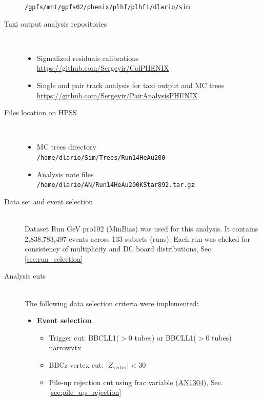 \begin{description}
         \texttt{/gpfs/mnt/gpfs02/phenix/plhf/plhf1/dlario/sim}
      \item[Taxi output analysis repositories]~
         \begin{itemize}
            \item{Sigmalized residuals calibrations} \\
               \url{https://github.com/Sergeyir/CalPHENIX}
            \item{Single and pair track analysis for taxi output and MC trees} \\
               \url{https://github.com/Sergeyir/PairAnalysisPHENIX} 
         \end{itemize}
      \item[Files location on HPSS]~
         \begin{itemize}
            \item{MC trees directory} \\
               \texttt{/home/dlario/Sim/Trees/Run14HeAu200} 
            \item{Analysis note files} \\
					\texttt{/home/dlario/AN/Run14HeAu200KStar892.tar.gz}
         \end{itemize}
		\item[Data set and event selection]~\\
         Dataset Run GeV \colsystem pro102 (MinBias) was used for this analysis. It contains 2,838,783,497 events across 133 subsets (runs). Each run was cheked for consistency of multiplicity and DC board distributions, Sec. \ref{sec:run_selection}
		\item[Analysis cuts]~\\
			The following data selection criteria were implemented:
			\begin{itemize}
            \item \textbf{Event selection}
					\begin{itemize}
                  \item Trigger cut: BBCLL1($>0$ tubes) or BBCLL1($>0$ tubes) narrowvtx
                  \item BBCz vertex cut: $\lvert Z_{\text{vertex}} \rvert < 30$
                  \item Pile-up rejection cut using $\text{frac}$ variable (\href{https://phenix-intra.sdcc.bnl.gov/phenix/WWW/p/draft/dcm07e/DoubleInteractionAN/small-system-double.pdf}{AN1304}), Sec. \ref{sec:pile_up_rejection}
					\end{itemize}

\end{itemize}
\end{description}
